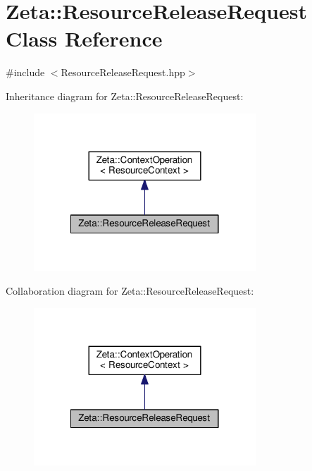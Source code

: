\hypertarget{classZeta_1_1ResourceReleaseRequest}{\section{Zeta\+:\+:Resource\+Release\+Request Class Reference}
\label{classZeta_1_1ResourceReleaseRequest}
}


{\ttfamily \#include $<$Resource\+Release\+Request.\+hpp$>$}



Inheritance diagram for Zeta\+:\+:Resource\+Release\+Request\+:\nopagebreak
\begin{figure}[H]
\begin{center}
\leavevmode
\includegraphics[width=236pt]{classZeta_1_1ResourceReleaseRequest__inherit__graph}
\end{center}
\end{figure}


Collaboration diagram for Zeta\+:\+:Resource\+Release\+Request\+:\nopagebreak
\begin{figure}[H]
\begin{center}
\leavevmode
\includegraphics[width=236pt]{classZeta_1_1ResourceReleaseRequest__coll__graph}
\end{center}
\end{figure}
